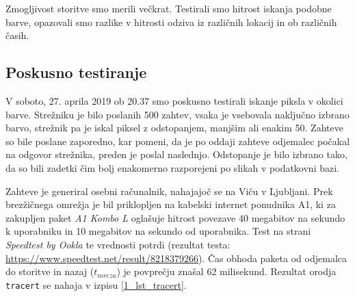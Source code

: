 Zmogljivost storitve smo merili večkrat.
Testirali smo hitrost iskanja podobne barve, opazovali smo razlike v hitrosti odziva iz različnih lokacij in ob različnih časih.

\subsection{Poskusno testiranje}

V soboto, 27. aprila 2019 ob 20.37 smo poskusno testirali iskanje piksla v okolici barve.
Strežniku je bilo poslanih 500 zahtev, vsaka je vsebovala naključno izbrano barvo, strežnik pa je iskal piksel z odstopanjem, manjšim ali enakim 50.
Zahteve so bile poslane zaporedno, kar pomeni, da je po oddaji zahteve odjemalec počakal na odgovor strežnika, preden je poslal naslednjo.
Odstopanje je bilo izbrano tako, da so bili zadetki čim bolj enakomerno razporejeni po slikah v podatkovni bazi.

Zahteve je generiral osebni računalnik, nahajajoč se na Viču v Ljubljani.
Prek brezžičnega omrežja je bil priklopljen na kabelski internet ponudnika A1, ki za zakupljen paket \emph{A1 Kombo L} oglašuje hitrost povezave 40 megabitov na sekundo k uporabniku in 10 megabitov na sekundo od uporabnika.
Test na strani \emph{Speedtest by Ookla} te vrednosti potrdi (rezultat testa: \url{https://www.speedtest.net/result/8218379266}).
Čas obhoda paketa od odjemalca do storitve in nazaj ($t_{mreza}$) je povprečju znašal 62 milisekund.
Rezultat orodja \texttt{tracert} se nahaja v izpisu \ref{1_lst_tracert}.

